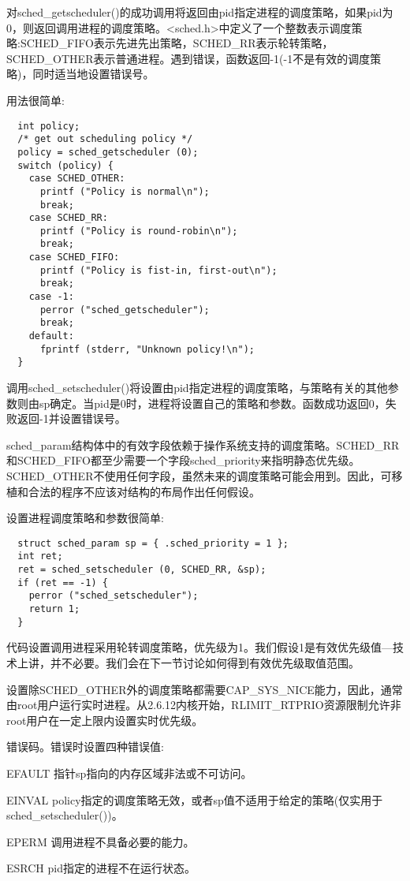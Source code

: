  对sched\_getscheduler()的成功调用将返回由pid指定进程的调度策略，如果pid为0，则返回调用进程的调度策略。<sched.h>中定义了一个整数表示调度策略:SCHED\_FIFO表示先进先出策略，SCHED\_RR表示轮转策略，SCHED\_OTHER表示普通进程。遇到错误，函数返回-1(-1不是有效的调度策略)，同时适当地设置错误号。

  用法很简单:

\begin{lstlisting}
  int policy;
  /* get out scheduling policy */
  policy = sched_getscheduler (0);
  switch (policy) {
    case SCHED_OTHER:
      printf ("Policy is normal\n");
      break;
    case SCHED_RR:
      printf ("Policy is round-robin\n");
      break;
    case SCHED_FIFO:
      printf ("Policy is fist-in, first-out\n");
      break;
    case -1:
      perror ("sched_getscheduler");
      break;
    default:
      fprintf (stderr, "Unknown policy!\n");
  }
\end{lstlisting}

  调用sched\_setscheduler()将设置由pid指定进程的调度策略，与策略有关的其他参数则由sp确定。当pid是0时，进程将设置自己的策略和参数。函数成功返回0，失败返回-1并设置错误号。

  sched\_param结构体中的有效字段依赖于操作系统支持的调度策略。SCHED\_RR和SCHED\_FIFO都至少需要一个字段sched\_priority来指明静态优先级。SCHED\_OTHER不使用任何字段，虽然未来的调度策略可能会用到。因此，可移植和合法的程序不应该对结构的布局作出任何假设。

  设置进程调度策略和参数很简单:

\begin{lstlisting}
  struct sched_param sp = { .sched_priority = 1 };
  int ret;
  ret = sched_setscheduler (0, SCHED_RR, &sp);
  if (ret == -1) {
    perror ("sched_setscheduler");
    return 1;
  }
\end{lstlisting}

  代码设置调用进程采用轮转调度策略，优先级为1。我们假设1是有效优先级值---技术上讲，并不必要。我们会在下一节讨论如何得到有效优先级取值范围。

  设置除SCHED\_OTHER外的调度策略都需要CAP\_SYS\_NICE能力，因此，通常由root用户运行实时进程。从2.6.12内核开始，RLIMIT\_RTPRIO资源限制允许非root用户在一定上限内设置实时优先级。

  错误码。错误时设置四种错误值:

\begin{eqlist*}
\item[EFAULT] 指针sp指向的内存区域非法或不可访问。
\item[EINVAL] policy指定的调度策略无效，或者sp值不适用于给定的策略(仅实用于sched\_setscheduler())。
\item[EPERM] 调用进程不具备必要的能力。
\item[ESRCH] pid指定的进程不在运行状态。
\end{eqlist*}

